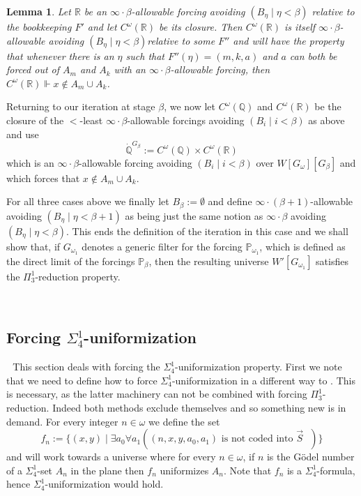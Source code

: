 \documentclass[a4paper,11pt]{article}
\newtheorem{lemma}[theorem]{Lemma}
\newcommand{\forceP}{\mathbb{P}}
\newcommand{\forceQ}{\mathbb{Q}}
\newcommand{\forceR}{\mathbb{R}}
\begin{document}
\begin{lemma}
Let $\forceR$ be an $\infty \cdot \beta$-allowable forcing avoiding $(B_{\eta} \mid \eta < \beta)$ relative to the bookkeeping $F'$ and let $C^{\omega} (\forceR)$ be its closure. Then $C^{\omega} (\forceR)$ is itself $\infty \cdot \beta$-allowable avoiding $(B_{\eta} \mid \eta < \beta)$relative to some $F''$ and 
will have the property that whenever there is an $\eta$ such that $F''(\eta) = (m,k,a)$ and $a$ can both be forced out of $A_m$ and $A_k$ with an $\infty \cdot \beta$-allowable forcing, then $C^{\omega} (\forceR) \Vdash x \notin A_m \cup A_k$.

\end{lemma}
    Returning to our iteration at stage $\beta$, we now let $C^{\omega} (\forceQ)$ and $C^{\omega} (\forceR)$  be the closure of the $<$-least $\infty \cdot \beta$-allowable forcings avoiding $(B_i \mid i <\beta)$ as above and use
    ﻿
    \[ \dot{\forceQ}^{G_{\beta}} :=C^{\omega} (\forceQ) \times C^{\omega} (\forceR) \]
which is an $\infty \cdot  \beta $-allowable forcing avoiding $(B_i \mid i <\beta)$ over $W[G_{\omega}][G_{\beta}]$ and which forces that $x \notin A_m \cup A_k$.
    ﻿


For all three cases above we finally let $B_{\beta}:= \emptyset$
and define $\infty \cdot (\beta+1)$-allowable avoiding $(B_{\eta} \mid \eta < \beta+1)$  as being just the same notion as $\infty \cdot \beta$ avoiding $(B_{\eta} \mid \eta < \beta)$.
    ﻿
    This ends the definition of the iteration in this case and we shall show that, if $G_{\omega_1}$ denotes a generic filter for the forcing $\forceP_{\omega_1}$, which is defined as the direct limit of the forcings $\forceP_{\beta}$, then the resulting universe $W'[G_{\omega_1}]$ satisfies the $\Pi^1_3$-reduction property.
    ﻿

    ﻿
    \subsection{Forcing \texorpdfstring{$\Sigma^1_4$}{Sigma14}-uniformization}
    ﻿
    ﻿
  This section deals with forcing the $\Sigma^1_4$-uniformization property. First we note that we need to define how to force $\Sigma^1_4$-uniformization in a different way to \cite{BPFA and uniformization}. This is necessary, as the latter machinery can not be combined with forcing $\Pi^1_3$-reduction. Indeed both methods exclude themselves and so something new is in demand.
For every integer $n \in \omega$ we define the set 
\[ f_n:= \{ (x,y) \mid \exists a_0 \forall a_1 ((n,x,y,a_0,a_1) \text{ is not coded into $\vec{S} $ }) \} \]
and will work towards a universe where for every $n \in \omega$, if $n$ is the G\"odel number of a $\Sigma^1_4$-set $A_n$ in the plane then $f_n$ uniformizes $A_n$. Note that $f_n$ is a $\Sigma^1_4$-formula, hence $\Sigma^1_4$-uniformization would hold.
\end{document}
